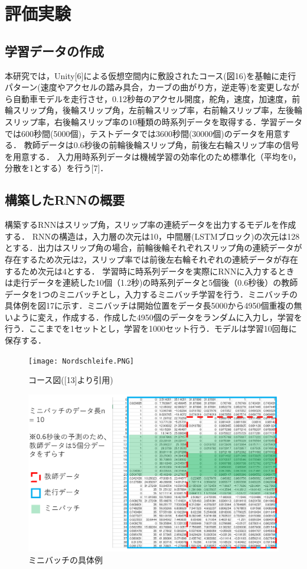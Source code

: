 \documentclass[twocolumn]{jsarticle}
\begin{document}
\section{評価実験}
\subsection{学習データの作成}
本研究では，Unity[6]による仮想空間内に敷設されたコース(図16)を基軸に走行パターン(速度やアクセルの踏み具合，カーブの曲がり方，逆走等)を変更しながら自動車モデルを走行させ，0.12秒毎のアクセル開度，舵角，速度，加速度，前輪スリップ角，後輪スリップ角，左前輪スリップ率，右前輪スリップ率，左後輪スリップ率，右後輪スリップ率の10種類の時系列データを取得する．学習データでは600秒間(5000個)，テストデータでは3600秒間(30000個)のデータを用意する．
教師データは0.6秒後の前輪後輪スリップ角，前後左右輪スリップ率の信号を用意する．
入力用時系列データは機械学習の効率化のため標準化（平均を0，分散を1とする）を行う[7]．
\subsection{構築したRNNの概要}
構築するRNNはスリップ角，スリップ率の連続データを出力するモデルを作成する．
RNNの構造は，入力層の次元は10，中間層(LSTMブロック)の次元は128とする．出力はスリップ角の場合，前輪後輪それぞれスリップ角の連続データが存在するため次元は2，スリップ率では前後左右輪それぞれの連続データが存在するため次元は4とする．
学習時に時系列データを実際にRNNに入力するときは走行データを連続した10個（1.2秒)の時系列データと5個後（0.6秒後）の教師データを1つのミニバッチとし，入力するミニバッチ学習を行う．ミニバッチの具体例を図17に示す．ミニバッチは開始位置をデータ長5000から4950個重複の無いように変え，作成する．作成した4950個のデータをランダムに入力し，学習を行う．ここまでを1セットとし，学習を1000セット行う．モデルは学習10回毎に保存する．

\onecolumn
\begin{figure}[tbp]
	\centering
	\texttt{[image: Nordschleife.PNG]}
	\caption{コース図([13]より引用)}
	\label{fig17}
\end{figure}
\begin{figure}[tbp]
	\centering
	\includegraphics[width=12cm]{minibatch.PNG}
	\caption{ミニバッチの具体例}
	\label{fig18}
\end{figure}
\twocolumn
\end{document}
